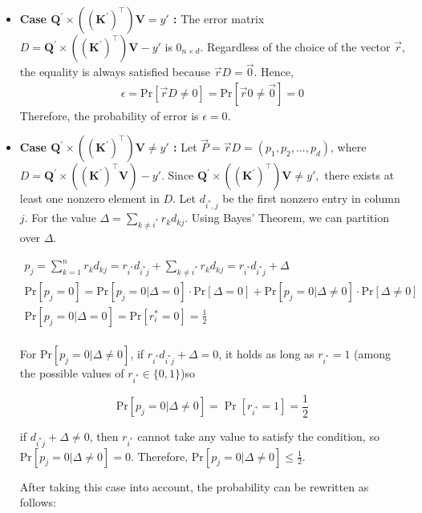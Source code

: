 \documentclass[11pt]{article}
\begin{document}
\begin{itemize}
    \item \textbf{Case $\mathbf{Q}^{'} \times ((\mathbf{K}^{'})^\top)\mathbf{V} = y'$ :} The error matrix $D= \mathbf{Q}^{'} \times ((\mathbf{K}^{'})^\top)\mathbf{V} -y'$ is $0_{n\times d}$. Regardless of the choice of the vector $\vec{r}$, the equality is always satisfied because $\vec{r}D=\vec{0}$. Hence, 
    \[ \label{neqzero}
    \begin{split}
        \epsilon = \text{Pr}[\vec{r}D\neq 0] = \text{Pr}[\vec{r}0\neq \vec{0}] = 0
    \end{split}
    \]
    Therefore, the probability of error is $\epsilon=0$.
    \item \textbf{Case $\mathbf{Q}^{'} \times ((\mathbf{K}^{'})^\top)\mathbf{V} \neq y'$ : } Let $\vec{P} = \vec{r}D= (p_1,p_2,...,p_d)$, where $D = \mathbf{Q}^{'} \times ((\mathbf{K}^{'})^\top \mathbf{V}) - y'.$ Since $\mathbf{Q}^{'} \times ((\mathbf{K}^{'})^\top)\mathbf{V} \neq y',$ there exists at least one nonzero element in $D$. Let $d_{i^*,j}$ be the first nonzero entry in column $j$. For the value $\Delta=\sum_{k\neq i^*} r_kd_{kj}$. Using Bayes' Theorem, we can partition over $\Delta$.

    \[ \label{neqzero}
    \begin{split}
        p_j=\sum_{k=1}^n r_k d_{kj}= r_{i^*} d_{i^* j} + \sum_{k\neq i^*} r_k d_{kj} = r_{i^*} d_{i^* j} + \Delta \\
        \text{Pr}[p_j=0]=\text{Pr}[p_j=0|\Delta=0]\cdot \text{Pr}[\Delta=0] + \text{Pr}[p_j=0|\Delta\neq0]\cdot \text{Pr}[\Delta\neq 0] \\
        \text{Pr}[p_j=0|\Delta=0]=\text{Pr}[r_i^*=0]=\frac{1}{2} \\
    \end{split}
    \]

    For $\text{Pr}[p_j=0|\Delta\neq0]$, if $r_{i^*}d_{i^*j} + \Delta = 0$, it holds as long as $r_{i^*}=1$ (among the possible values of $r_{i^*} \in \{0,1\}$)so 
    
    \[
        \text{Pr}[p_j=0|\Delta\neq0] = \Pr[r_{i^*}=1] = \frac{1}{2}
    \]
        
    if $d_{i^*j} + \Delta \neq 0$, then $r_{i^*}$ cannot take any value to satisfy the condition, so $\text{Pr}[p_j=0|\Delta\neq0] = 0$. Therefore, $\text{Pr}[p_j=0|\Delta\neq0] \le \frac{1}{2}$.

    After taking this case into account, the probability can be rewritten as follows:


\end{itemize}
\end{document}
